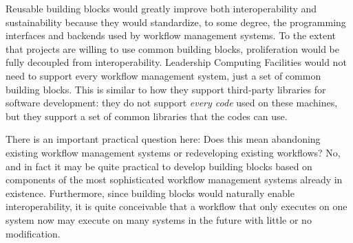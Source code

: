 Reusable building blocks would greatly improve both interoperability and sustainability because they would standardize, to some degree, the programming interfaces and backends used by workflow management systems. To the extent that projects are willing to use common building blocks, proliferation would be fully decoupled from interoperability. Leadership Computing Facilities would not need to support every workflow management system, just a set of common building blocks. This is similar to how they support third-party libraries for software development: they do not support \textit{every code} used on these machines, but they support a set of common libraries that the codes can use. 

There is an important practical question here: Does this mean abandoning existing workflow management systems or redeveloping existing workflows? No, and in fact it may be quite practical to develop building blocks based on components of the most sophisticated workflow management systems already in existence. Furthermore, since building blocks would naturally enable interoperability, it is quite conceivable that a workflow that only executes on one system now may execute on many systems in the future with little or no modification. 

